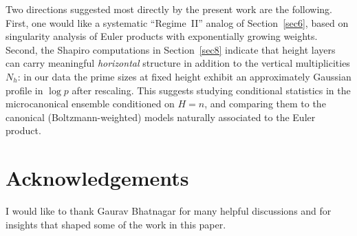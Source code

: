 \documentclass[11pt]{article}
\theoremstyle{definition}
\begin{document}
Two directions suggested most directly by the present work are the following.
First, one would like a systematic ``Regime~II'' analog of Section~\ref{sec6},
based on singularity analysis of Euler products with exponentially growing
weights.  Second, the Shapiro computations in Section~\ref{sec8} indicate that
height layers can carry meaningful \emph{horizontal} structure in addition to
the vertical multiplicities $N_h$: in our data the prime sizes at fixed height
exhibit an approximately Gaussian profile in $\log p$ after rescaling.  This
suggests studying conditional statistics in the microcanonical ensemble
conditioned on $H=n$, and comparing them to the canonical (Boltzmann-weighted)
models naturally associated to the Euler product.

\section*{Acknowledgements}
I would like to thank Gaurav Bhatnagar for many helpful discussions and for insights that shaped some of the work in this paper.
\end{document}
